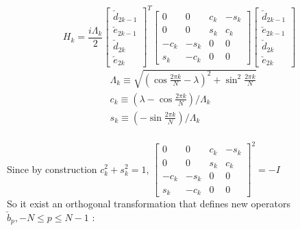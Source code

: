 \documentclass[12pt,a4paper]{book}
\theoremstyle{definition}
\begin{document}
\begin{equation}H_{k}=\frac{i\Lambda_k}{2}\left[\begin{array}{c}
		\check{d}_{2 k-1} \\
		\check{e}_{2 k-1} \\
		\check{d}_{2 k} \\
		\check{e}_{2 k}
	\end{array}\right]^{T}\left[\begin{array}{cccc}
		0 & 0 & c_{k} & -s_{k} \\
		0 & 0 & s_{k} & c_{k} \\
		-c_{k} &-s_{k} & 0 & 0 \\
		s_{k} &- c_{k} & 0 & 0
	\end{array}\right]\left[\begin{array}{c}
		\check{d}_{2 k-1} \\
		\check{e}_{2 k-1} \\
		\check{d}_{2 k} \\
		\check{e}_{2 k}
	\end{array}\right]\end{equation}
\newline
\begin{equation}
	\begin{aligned}
		&\Lambda_k \equiv\sqrt{\left(\cos \frac{2 \pi k }{N}-\lambda\right)^2+\sin^2 \frac{2 \pi k }{N}}
		\\
		&c_{k}\equiv\left(\lambda-\cos \frac{2 \pi k }{N}\right)/\Lambda_k
		\\
		&s_{k}\equiv\left(-\sin \frac{2 \pi k }{N}\right)/\Lambda_k
	\end{aligned}
\end{equation}\\
Since by construction $c_k^2+s_k^2=1$,
$\left[\begin{array}{cccc}
	0 & 0 & c_{k} & -s_{k} \\
	0 & 0 & s_{k} & c_{k} \\
	-c_{k} &-s_{k} & 0 & 0 \\
	s_{k} &- c_{k} & 0 & 0\end{array}\right]^2 =-I$ \\
So it exist an orthogonal transformation that defines new operators $\check{b}_{p},  -N\le p \le N-1$ :
\end{document}
